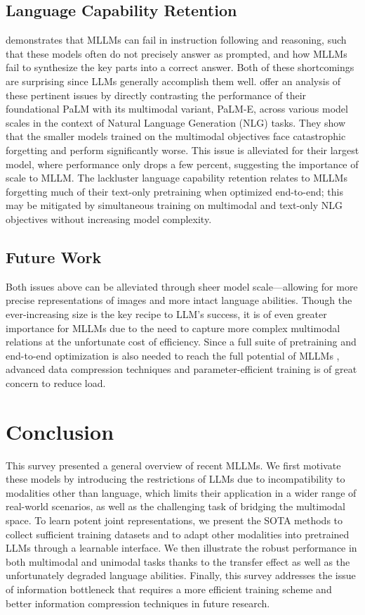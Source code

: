 \documentclass[11pt]{article}
\begin{document}
\subsection{Language Capability Retention}
\citet{fu2023mme} demonstrates that MLLMs can fail in instruction following and reasoning, such that these models often do not precisely answer as prompted, and how MLLMs fail to synthesize the key parts into a correct answer. Both of these shortcomings are surprising since LLMs generally accomplish them well. \citet{DBLP:conf/icml/DriessXSLCIWTVY23} offer an analysis of these pertinent issues by directly contrasting the performance of their foundational PaLM with its multimodal variant, PaLM-E, across various model scales in the context of Natural Language Generation (NLG) tasks. They show that the smaller models trained on the multimodal objectives face catastrophic forgetting and perform significantly worse. This issue is alleviated for their largest model, where performance only drops a few percent, suggesting the importance of scale to MLLM. The lackluster language capability retention relates to MLLMs forgetting much of their text-only pretraining when optimized end-to-end; this may be mitigated by simultaneous training on multimodal and text-only NLG objectives without increasing model complexity.

\subsection{Future Work}
Both issues above can be alleviated through sheer model scale—allowing for more precise representations of images and more intact language abilities. Though the ever-increasing size is the key recipe to LLM's success, it is of even greater importance for MLLMs due to the need to capture more complex multimodal relations at the unfortunate cost of efficiency. Since a full suite of pretraining and end-to-end optimization is also needed to reach the full potential of MLLMs \citep{DBLP:conf/icml/DriessXSLCIWTVY23}, advanced data compression techniques and parameter-efficient training is of great concern to reduce load.

\section{Conclusion}
This survey presented a general overview of recent MLLMs. We first motivate these models by introducing the restrictions of LLMs due to incompatibility to modalities other than language, which limits their application in a wider range of real-world scenarios, as well as the challenging task of bridging the multimodal space. To learn potent joint representations, we present the SOTA methods to collect sufficient training datasets and to adapt other modalities into pretrained LLMs through a learnable interface. We then illustrate the robust performance in both multimodal and unimodal tasks thanks to the transfer effect as well as the unfortunately degraded language abilities. Finally, this survey addresses the issue of information bottleneck that requires a more efficient training scheme and better information compression techniques in future research.
\end{document}
